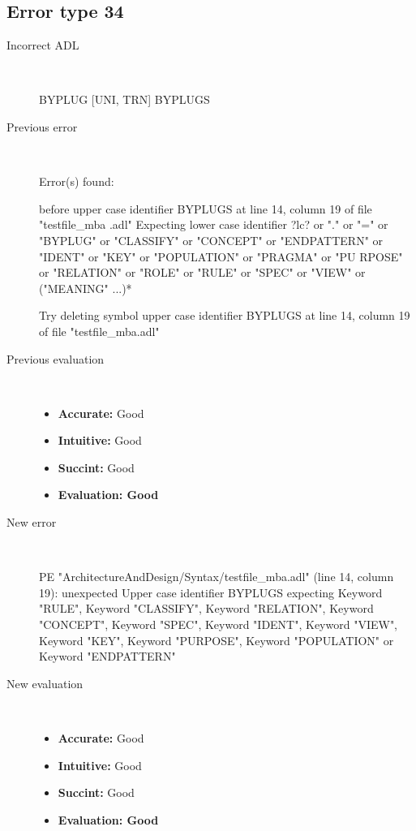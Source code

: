 \hrulefill

\subsection{Error type 34}
  \begin{description}
  \item[Incorrect ADL]~\\
\begin{adl}
BYPLUG [UNI, TRN] BYPLUGS\end{adl}
  \item[Previous error]~\\
\begin{haskell}
Error(s) found:

before upper case identifier BYPLUGS at line 14, column 19 of file "testfile_mba
.adl"
Expecting lower case identifier ?lc? or "." or "=" or "BYPLUG" or "CLASSIFY" or
"CONCEPT" or "ENDPATTERN" or "IDENT" or "KEY" or "POPULATION" or "PRAGMA" or "PU
RPOSE" or "RELATION" or "ROLE" or "RULE" or "SPEC" or "VIEW" or ("MEANING" ...)*

Try deleting symbol upper case identifier BYPLUGS at line 14, column 19 of file
"testfile_mba.adl"\end{haskell}
  \item[Previous evaluation]~\\
    \begin{itemize}
    \item \textbf{Accurate:} Good
    \item \textbf{Intuitive:} Good
    \item \textbf{Succint:} Good
    \item \textbf{Evaluation: Good}
    \end{itemize}
  \item[New error]~\\
\begin{haskell}
PE "ArchitectureAndDesign/Syntax/testfile_mba.adl" (line 14, column 19):
unexpected Upper case identifier BYPLUGS
expecting Keyword "RULE", Keyword "CLASSIFY", Keyword "RELATION", Keyword "CONCEPT", Keyword "SPEC", Keyword "IDENT", Keyword "VIEW", Keyword "KEY", Keyword "PURPOSE", Keyword "POPULATION" or Keyword "ENDPATTERN"\end{haskell}
  \item[New evaluation]~\\
    \begin{itemize}
    \item \textbf{Accurate:} Good
    \item \textbf{Intuitive:} Good
    \item \textbf{Succint:} Good
    \item \textbf{Evaluation: Good
}
    \end{itemize}
  \end{description}

